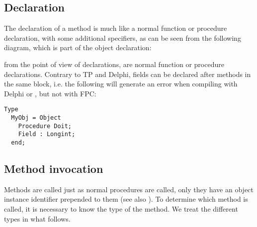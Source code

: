 \subsection{Declaration}
The declaration of a method is much like a normal function or procedure
declaration, with some additional specifiers, as can be seen from the
following diagram, which is part of the object declaration:

from the point of view of declarations,  are 
normal function or procedure declarations.
Contrary to TP and Delphi, fields can be declared after methods in the same 
block, i.e. the following will generate an error when compiling with Delphi
or \tp, but not with FPC:
\begin{verbatim}
Type 
  MyObj = Object
    Procedure Doit;
    Field : Longint;
  end;
\end{verbatim}


\subsection{Method invocation}
Methods are called just as normal procedures are called, only they have an
object instance identifier prepended to them (see also ).
To determine which method is called, it is necessary to know the type of
the method. We treat the different types in what follows.

